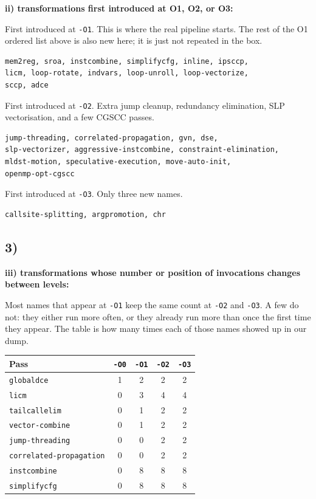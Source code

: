 \documentclass[11pt,a4paper]{article}
\begin{document}
\textbf{ii) transformations first introduced at O1, O2, or O3:}

First introduced at \texttt{-O1}. This is where the real pipeline
starts. The rest of the O1 ordered list above is also new here; it
is just not repeated in the box.

\begin{lstlisting}[language={}]
mem2reg, sroa, instcombine, simplifycfg, inline, ipsccp,
licm, loop-rotate, indvars, loop-unroll, loop-vectorize,
sccp, adce
\end{lstlisting}

First introduced at \texttt{-O2}. Extra jump cleanup, redundancy
elimination, SLP vectorisation, and a few CGSCC passes.

\begin{lstlisting}[language={}]
jump-threading, correlated-propagation, gvn, dse,
slp-vectorizer, aggressive-instcombine, constraint-elimination,
mldst-motion, speculative-execution, move-auto-init,
openmp-opt-cgscc
\end{lstlisting}

First introduced at \texttt{-O3}. Only three new names.

\begin{lstlisting}[language={}]
callsite-splitting, argpromotion, chr
\end{lstlisting}

\subsection*{3)}

\textbf{iii) transformations whose number or position of invocations
changes between levels:}

Most names that appear at \texttt{-O1} keep the same count at
\texttt{-O2} and \texttt{-O3}. A few do not: they either run more
often, or they already run more than once the first time they
appear. The table is how many times each of those names showed up
in our dump.

{\small
\begin{tabular}{lcccc}
\hline
Pass & \texttt{-O0} & \texttt{-O1} & \texttt{-O2} & \texttt{-O3} \\
\hline
\texttt{globaldce} & 1 & 2 & 2 & 2 \\
\texttt{licm} & 0 & 3 & 4 & 4 \\
\texttt{tailcallelim} & 0 & 1 & 2 & 2 \\
\texttt{vector-combine} & 0 & 1 & 2 & 2 \\
\texttt{jump-threading} & 0 & 0 & 2 & 2 \\
\texttt{correlated-propagation} & 0 & 0 & 2 & 2 \\
\texttt{instcombine} & 0 & 8 & 8 & 8 \\
\texttt{simplifycfg} & 0 & 8 & 8 & 8 \\
\hline
\end{tabular}
}
\end{document}
